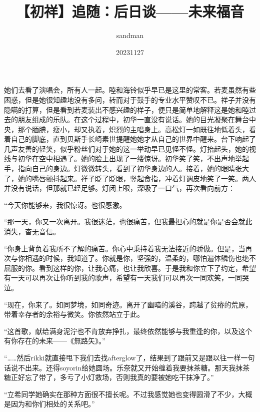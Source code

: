 \documentclass{article}
\title{【初祥】追随：后日谈——未来福音}
\author{sandman}
\date{20231127}
\begin{document}



\Large

她们去看了演唱会，所有人一起。睦和海铃似乎早已是这里的常客。若麦虽然有些困惑，但是她很知趣地没有多问，转而对于鼓手的专业水平赞叹不已。祥子并没有隐瞒的打算，但是看到若麦装出不感兴趣的样子，便只是简单地解释这是她和睦过去的朋友组成的乐队。在这个过程中，初华一直没有说话。她的目光凝聚在舞台中央，那个腼腆，瘦小，却又执着，炽烈的主唱身上。高松灯一如既往地低着头，看着自己的脚底，直到贝斯手长崎素世提醒她她才从自己的世界中醒来。台下响起了几声友善的轻笑，似乎粉丝们对于她的这一举动早已见怪不怪。灯抬起头，她的视线与初华在空中相遇了。她的脸上出现了一缕惊讶。初华笑了笑，不出声地举起手，指向自己的身边。灯微微转头，看到了初华身边的人。接着，她的眼睛张大了，她的嘴唇颤抖起来。祥子眨了眨眼，竖起食指，冲着灯调皮地笑了一笑。两人并没有说话，但那就已经足够。灯闭上眼，深吸了一口气，再次看向前方：



“今天你能够来，我很惊讶。也很感激。



“那一天，你又一次离开。我很迷茫，也很痛苦，但我最担心的就是你是否会就此消失，杳无音信。



“你身上背负着我所不了解的痛苦。你心中秉持着我无法接近的骄傲。但是，当再次与你相遇的时候，我知道了。你就是你，坚强的，温柔的，哪怕遍体鳞伤也绝不屈服的你。看到这样的你，让我心痛，也让我欣喜。于是我和你立下了约定，希望有一天可以再次让你听到我的歌声，希望有一天我们可以再次一同欢笑，一同哭泣。



“现在，你来了。如同梦境，如同奇迹。离开了幽暗的溪谷，跨越了贫瘠的荒原，带着幸存者的余裕与微笑。你依然站立于此。



“这首歌，献给满身泥泞也不肯放弃挣扎，最终依然能够与我重逢的你，以及这个有你存在的未来——《無路矢》。”



\newpage



“……然后rikki就直接甩下我们去找afterglow了，结果到了跟前又是跟以往一样一句话说不出来。还得soyorin给她圆场。乐奈就又开始缠着我要抹茶糖。那天我抹茶糖正好忘了带了，多亏了小灯救场，否则我真的要被她吃干抹净了。”



“立希同学她确实在那种方面很不擅长呢。不过我感觉她也变得圆滑了不少，大概是因为和你们相处的关系吧。”
\end{document}

